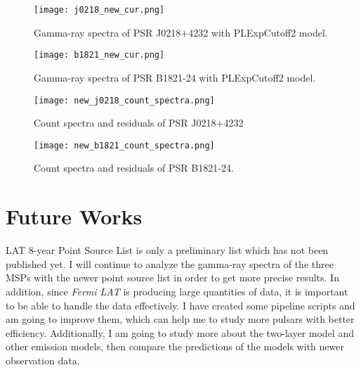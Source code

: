\documentclass[12pt]{report}
\begin{document}
    \begin{figure}[!htp]
      \centering 
      \texttt{[image: j0218\_new\_cur.png]}
      \caption{Gamma-ray spectra of PSR J0218+4232 with PLExpCutoff2 model.}
      \label{fig: j0218_new_cur}
    \end{figure}

    \begin{figure}[!htp]
      \centering 
      \texttt{[image: b1821\_new\_cur.png]}
      \caption{Gamma-ray spectra of PSR B1821-24 with PLExpCutoff2 model.}
      \label{fig: b1821_new_cur}
    \end{figure}


    \begin{figure}[!htp]
      \centering 
      \texttt{[image: new\_j0218\_count\_spectra.png]}
      \caption{Count spectra and residuals of PSR J0218+4232}
      \label{fig: new_j0218_count_spectra}
    \end{figure}

    \begin{figure}[!htp]
      \centering 
      \texttt{[image: new\_b1821\_count\_spectra.png]}
      \caption{Count spectra and residuals of PSR B1821-24.}
      \label{fig: new_b1821_count_spectra}
    \end{figure}
    

    \section{Future Works}
      LAT 8-year Point Source List is only a preliminary list which has not been published 
      yet. I will continue to analyze the gamma-ray spectra of the three MSPs with the 
      newer point source list in order to get more precise results. In addition, since 
      \textit{Fermi LAT} is producing large quantities of data, it is important to be able 
      to handle the data effectively. I have created some pipeline scripts and am going to
      improve them, which can help me to study more pulsars with better efficiency.
      Additionally, I am going to study more about the two-layer model and other emission 
      models, then compare the predictions of the models with newer observation data.





          
\end{document}
